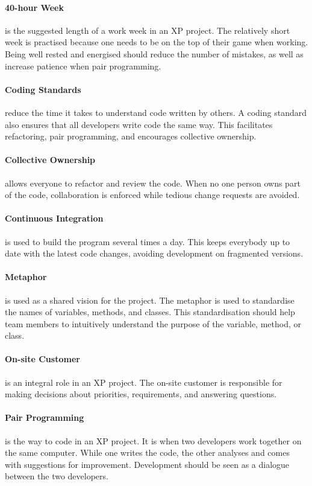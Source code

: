 \paragraph{40-hour Week} is the suggested length of a work week in an XP project.
The relatively short week is practised because one needs to be on the top of their game when working.
Being well rested and energised should reduce the number of mistakes, as well as increase patience when pair programming.

\paragraph{Coding Standards} reduce the time it takes to understand code written by others.
A coding standard also ensures that all developers write code the same way.
This facilitates refactoring, pair programming, and encourages collective ownership.

\paragraph{Collective Ownership} allows everyone to refactor and review the code.
When no one person owns part of the code, collaboration is enforced while tedious change requests are avoided.

\paragraph{Continuous Integration} is used to build the program several times a day.
This keeps everybody up to date with the latest code changes, avoiding development on fragmented versions.

\paragraph{Metaphor} is used as a shared vision for the project.
The metaphor is used to standardise the names of variables, methods, and classes. 
This standardisation should help team members to intuitively understand the purpose of the variable, method, or class.

\paragraph{On-site Customer} is an integral role in an XP project.
The on-site customer is responsible for making decisions about priorities, requirements, and answering questions.

\paragraph{Pair Programming} is the way to code in an XP project.
It is when two developers work together on the same computer.
While one writes the code, the other analyses and comes with suggestions for improvement.
Development should be seen as a dialogue between the two developers.

